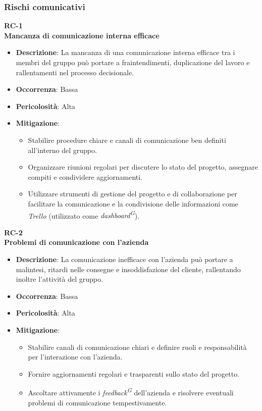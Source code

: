 \documentclass[5pt]{article}
\begin{document}
    \subsubsection{Rischi comunicativi}
      \textbf{RC-1}\\
      \textbf{Mancanza di comunicazione interna efficace}
      \begin{itemize}
        \item \textbf{Descrizione}: La mancanza di una comunicazione interna efficace tra i membri del gruppo può portare a fraintendimenti, duplicazione del lavoro e rallentamenti nel processo decisionale.
        \item \textbf{Occorrenza}: Bassa
        \item \textbf{Pericolosità}: Alta
        \item \textbf{Mitigazione}: 
          \begin{itemize}
            \item Stabilire procedure chiare e canali di comunicazione ben definiti all'interno del gruppo.
            \item Organizzare riunioni regolari per discutere lo stato del progetto, assegnare compiti e condividere aggiornamenti.
            \item Utilizzare strumenti di gestione del progetto e di collaborazione per facilitare la comunicazione e 
            la condivisione delle informazioni come \textit{Trello} (utilizzato come \textit{dashboard\textsuperscript{G}}).
          \end{itemize}
      \end{itemize}
      \textbf{RC-2}\\
      \textbf{Problemi di comunicazione con l'azienda}
      \begin{itemize}
        \item \textbf{Descrizione}: La comunicazione inefficace con l'azienda può portare a malintesi, ritardi nelle consegne e insoddisfazione del cliente, rallentando inoltre l'attività del gruppo.
        \item \textbf{Occorrenza}: Bassa
        \item \textbf{Pericolosità}: Alta
        \item \textbf{Mitigazione}: 
          \begin{itemize}
            \item Stabilire canali di comunicazione chiari e definire ruoli e responsabilità per l'interazione con l'azienda.
            \item Fornire aggiornamenti regolari e trasparenti sullo stato del progetto.
            \item Ascoltare attivamente i \textit{feedback\textsuperscript{G}} dell'azienda e risolvere eventuali problemi di comunicazione tempestivamente.
          \end{itemize}
      \end{itemize}
\end{document}
